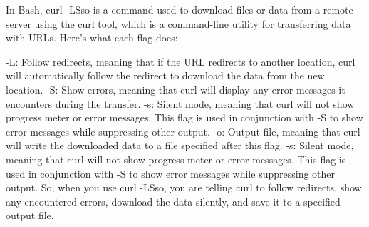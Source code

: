 In Bash, curl -LSso is a command used to download files or data from a remote server using the curl tool, which is a command-line utility for transferring data with URLs. Here's what each flag does:

-L: Follow redirects, meaning that if the URL redirects to another location, curl will automatically follow the redirect to download the data from the new location.
-S: Show errors, meaning that curl will display any error messages it encounters during the transfer.
-s: Silent mode, meaning that curl will not show progress meter or error messages. This flag is used in conjunction with -S to show error messages while suppressing other output.
-o: Output file, meaning that curl will write the downloaded data to a file specified after this flag.
-s: Silent mode, meaning that curl will not show progress meter or error messages. This flag is used in conjunction with -S to show error messages while suppressing other output.
So, when you use curl -LSso, you are telling curl to follow redirects, show any encountered errors, download the data silently, and save it to a specified output file.
